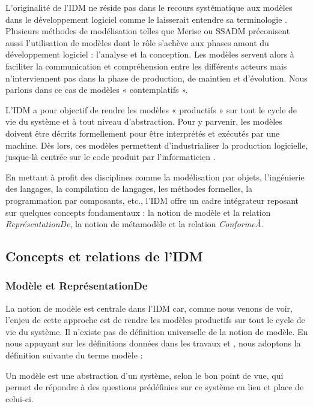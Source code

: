 L'originalité de l'IDM ne réside pas dans le recours systématique aux modèles 
dans le développement logiciel comme le laisserait entendre sa terminologie  
\cite{bezivin2004rapport}. Plusieurs méthodes de modélisation telles que Merise 
ou SSADM préconisent aussi l'utilisation de modèles dont le rôle s'achève aux 
phases amont du développement logiciel : l'analyse et la conception. Les modèles 
servent alors à faciliter la communication et compréhension entre les différents 
acteurs mais n'interviennent pas dans la phase de production, de maintien et 
d'évolution. Nous parlons dans ce cas de modèles « contemplatifs ». 

L'IDM a pour objectif de rendre les modèles « productifs » sur tout le cycle de 
vie du système et à tout niveau d'abstraction. Pour y parvenir, les modèles 
doivent être décrits formellement pour être interprétés et exécutés par une 
machine. Dès lors, ces modèles permettent d'industrialiser la production 
logicielle, jusque-là centrée sur le code produit par l'informaticien 
\cite{bezivin2005unification}.

En mettant à profit des disciplines comme la modélisation par objets, 
l'ingénierie des langages, la compilation de langages, les méthodes formelles, 
la programmation par composants, etc., l'IDM offre un cadre intégrateur reposant 
sur quelques concepts fondamentaux : la notion de modèle et la relation 
\textit{ReprésentationDe}, la notion de métamodèle et la relation 
\textit{ConformeÀ}.

\subsection{Concepts et relations de l'IDM}
\subsubsection{Modèle et ReprésentationDe}
La notion de modèle est centrale dans l'IDM car, comme nous venons de voir, 
l'enjeu de cette approche est de rendre les modèles productifs sur tout le cycle 
de vie du système. Il n'existe pas de définition universelle de la notion de 
modèle. En nous appuyant sur les définitions données dans les travaux 
\cite{minsky1967computation} \cite{bezivin2001towards} et 
\cite{seidewitz2003models}, nous adoptons la définition suivante du terme modèle 
:

\begin{definition}
Un modèle est une abstraction d'un système, selon le bon point de vue, qui 
permet de répondre à des questions prédéfinies sur ce système en lieu et place 
de celui-ci.
\end{definition}

